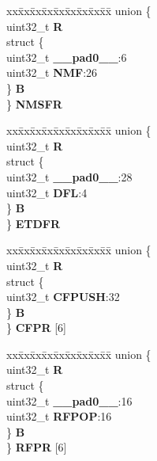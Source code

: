 \begin{DoxyCompactItemize}
\begin{tabbing}
\end{tabbing}\item 
\mbox{\label{structEQADC__tag_aae9876bae8ad5ce70b5068944959c7c4}} 
\begin{tabbing}
xx\=xx\=xx\=xx\=xx\=xx\=xx\=xx\=xx\=\kill
union \{\\
\>uint32\_t {\bfseries R}\\
\>struct \{\\
\>\>uint32\_t {\bfseries \_\_pad0\_\_}:6\\
\>\>uint32\_t {\bfseries NMF}:26\\
\>\} {\bfseries B}\\
\} {\bfseries NMSFR}\\

\end{tabbing}\item 
\mbox{\label{structEQADC__tag_a8f817e2b4f0069b1aea16f346f06e8d4}} 
\begin{tabbing}
xx\=xx\=xx\=xx\=xx\=xx\=xx\=xx\=xx\=\kill
union \{\\
\>uint32\_t {\bfseries R}\\
\>struct \{\\
\>\>uint32\_t {\bfseries \_\_pad0\_\_}:28\\
\>\>uint32\_t {\bfseries DFL}:4\\
\>\} {\bfseries B}\\
\} {\bfseries ETDFR}\\

\end{tabbing}\item 
\mbox{\label{structEQADC__tag_aea055ad96300b61c0c15c7c27b26e56d}} 
\begin{tabbing}
xx\=xx\=xx\=xx\=xx\=xx\=xx\=xx\=xx\=\kill
union \{\\
\>uint32\_t {\bfseries R}\\
\>struct \{\\
\>\>uint32\_t {\bfseries CFPUSH}:32\\
\>\} {\bfseries B}\\
\} {\bfseries CFPR} \mbox{[}6\mbox{]}\\

\end{tabbing}\item 
\mbox{\label{structEQADC__tag_ac1aeccd1915205a84a5156811984cf55}} 
\begin{tabbing}
xx\=xx\=xx\=xx\=xx\=xx\=xx\=xx\=xx\=\kill
union \{\\
\>uint32\_t {\bfseries R}\\
\>struct \{\\
\>\>uint32\_t {\bfseries \_\_pad0\_\_}:16\\
\>\>uint32\_t {\bfseries RFPOP}:16\\
\>\} {\bfseries B}\\
\} {\bfseries RFPR} \mbox{[}6\mbox{]}\\


\end{tabbing}
\end{DoxyCompactItemize}
